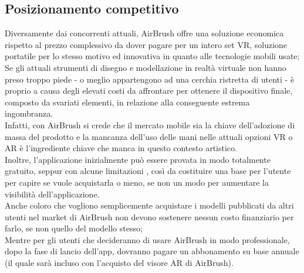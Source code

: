 \documentclass[11pt,fleqn]{book} %
\begin{document}
				

\subsection{Posizionamento competitivo}
Diversamente dai concorrenti attuali, AirBrush offre una soluzione economica rispetto al prezzo complessivo da dover pagare per un intero set VR, soluzione portatile per lo stesso motivo ed innovativa in quanto alle tecnologie mobili usate; \\
Se gli attuali strumenti di disegno e modellazione in realtà virtuale  non hanno preso troppo piede - o meglio appartengono ad una cerchia ristretta di utenti - è proprio a causa degli elevati costi da affrontare per ottenere il dispositivo finale, composto da svariati elementi, in relazione alla conseguente estrema ingombranza.\\
Infatti, con AirBrush si crede che il mercato mobile sia la chiave dell'adozione di massa del prodotto e la mancanza dell'uso delle mani nelle attuali opzioni VR o AR è l'ingrediente chiave che manca in questo contesto artistico.\\
Inoltre, l'applicazione inizialmente può essere provata in modo totalmente gratuito, seppur con alcune limitazioni , così da costituire una base per l'utente per capire se vuole acquistarla o meno, se non un modo per aumentare la visibilità dell'applicazione.\\
Anche coloro che vogliono semplicemente acquistare i modelli pubblicati da altri utenti nel market di AirBrush  non devono sostenere nessun costo finanziario per farlo, se non quello del modello stesso;\\
Mentre per gli utenti che decideranno di usare AirBrush in modo professionale, dopo la fase di lancio dell'app, dovranno pagare un abbonamento su base annuale (il quale sarà incluso con l'acquisto del visore AR di AirBrush).




\end{document}
